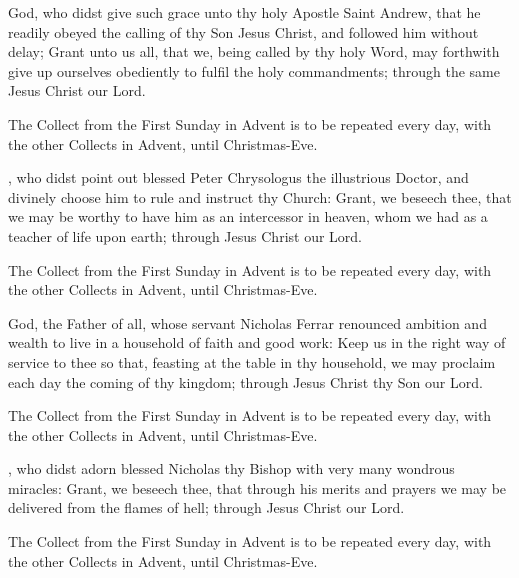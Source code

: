 God, who didst give such grace unto thy holy Apostle Saint Andrew, that he readily obeyed the calling of thy Son Jesus Christ, and followed him without delay; Grant unto us all, that we, being called by thy holy Word, may forthwith give up ourselves obediently to fulfil the holy commandments; through the same Jesus Christ our Lord.
\begin{secrubric}
The Collect from the First Sunday in Advent is to be repeated every day, with the other Collects in Advent, until Christmas-Eve.
\end{secrubric}

, who didst point out blessed Peter Chrysologus the illustrious Doctor, and divinely choose him to rule and instruct thy Church: Grant, we beseech thee, that we may be worthy to have him as an intercessor in heaven, whom we had as a teacher of life upon earth; through Jesus Christ our Lord.
\begin{secrubric}
The Collect from the First Sunday in Advent is to be repeated every day, with the other Collects in Advent, until Christmas-Eve.
\end{secrubric}

 God, the Father of all, whose servant Nicholas Ferrar renounced ambition and wealth to live in a household of faith and good work: Keep us in the right way of service to thee so that, feasting at the table in thy household, we may proclaim each day the coming of thy kingdom; through Jesus Christ thy Son our Lord.
\begin{secrubric}
The Collect from the First Sunday in Advent is to be repeated every day, with the other Collects in Advent, until Christmas-Eve.
\end{secrubric}

, who didst adorn blessed Nicholas thy Bishop with very many wondrous miracles: Grant, we beseech thee, that through his merits and prayers we may be delivered from the flames of hell; through Jesus Christ our Lord.
\begin{secrubric}
The Collect from the First Sunday in Advent is to be repeated every day, with the other Collects in Advent, until Christmas-Eve.
\end{secrubric}

